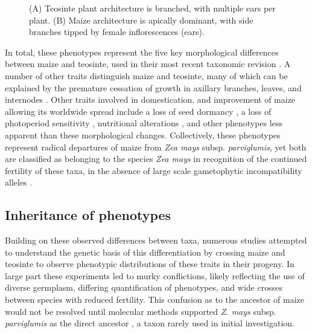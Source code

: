 \documentclass[9pt,twocolumn,twoside]{rilabRxiv}
\begin{document}
   \begin{figure}
        \caption{\label{fig:provance} (A) Teosinte plant architecture is branched, with multiple ears per plant. (B) Maize architecture is apically dominant, with side branches tipped by female inflorescences (ears). }
\end{figure}



In total, these phenotypes represent the five key morphological differences between maize and teosinte, used in their most recent taxonomic revision \citep{doebley1980, iltis1980}.
A number of other traits distinguish maize and teosinte, many of which can be explained by the premature cessation of growth in axillary branches, leaves, and internodes \citep{doebley1980}.
Other traits involved in domestication, and improvement of maize allowing its worldwide spread include a loss of seed dormancy \citep{avendanolopez2011}, a loss of photoperiod sensitivity \citep{huang2017}, nutritional alterations \citep{hanson1996, whitt2002}, and other phenotypes less apparent than these morphological changes.
Collectively, these phenotypes represent radical departures of maize from \textit{Zea mays} subsp. \textit{parviglumis}, yet both are classified as belonging to the species \textit{Zea mays} in recognition of the continued fertility of these taxa, in the absence of large scale gametophytic incompatibility alleles \citep{kermicle2006}.


\subsection*{Inheritance of phenotypes}


Building on these observed differences between taxa, numerous studies attempted to understand the genetic basis of this differentiation by crossing maize and teosinte to observe phenotypic distributions of these traits in their progeny.
In large part these experiments led to murky conflictions, likely reflecting the use of diverse germplasm, differing quantification of phenotypes, and wide crosses between species with reduced fertility.
This confusion as to the ancestor of maize would not be resolved until molecular methods supported \textit{Z. mays} subsp. \textit{parviglumis} as the direct ancestor \citep{bennetzen2001}, a taxon rarely used in initial investigation.
\end{document}
